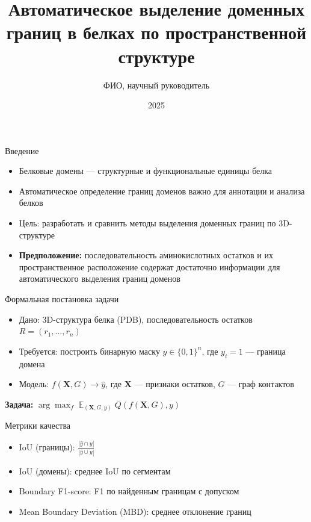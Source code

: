 \documentclass{beamer}
\title{Автоматическое выделение доменных границ в белках по пространственной структуре}
\author{ФИО, научный руководитель}
\date{2025}
\begin{document}
\begin{frame}
  \titlepage
\end{frame}

\begin{frame}{Введение}
  \begin{itemize}
    \item Белковые домены — структурные и функциональные единицы белка
    \item Автоматическое определение границ доменов важно для аннотации и анализа белков
    \item Цель: разработать и сравнить методы выделения доменных границ по 3D-структуре
    \item \textbf{Предположение:} последовательность аминокислотных остатков и их пространственное расположение содержат достаточно информации для автоматического выделения границ доменов
  \end{itemize}
\end{frame}

\begin{frame}{Формальная постановка задачи}
  \begin{itemize}
    \item Дано: 3D-структура белка (PDB), последовательность остатков $R = (r_1, \ldots, r_n)$
    \item Требуется: построить бинарную маску $y \in \{0,1\}^n$, где $y_i=1$ — граница домена
    \item Модель: $f(\mathbf{X}, G) \to \hat{y}$, где $\mathbf{X}$ — признаки остатков, $G$ — граф контактов
  \end{itemize}
  \vspace{0.5em}
  \textbf{Задача:} $\arg\max_f \; \mathbb{E}_{(\mathbf{X}, G, y)} \; Q(f(\mathbf{X}, G), y)$
\end{frame}

\begin{frame}{Метрики качества}
  \begin{itemize}
    \item IoU (границы): $\frac{|\hat{y} \cap y|}{|\hat{y} \cup y|}$
    \item IoU (домены): среднее IoU по сегментам
    \item Boundary F1-score: F1 по найденным границам с допуском
    \item Mean Boundary Deviation (MBD): среднее отклонение границ
  \end{itemize}
\end{frame}
\end{document}
